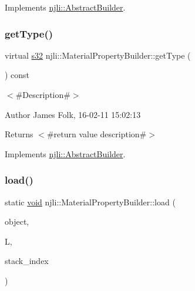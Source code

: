 Implements \mbox{\hyperlink{classnjli_1_1_abstract_builder_a0f2d344fcf697b167f4f2b1122b5fb33}{njli\+::\+Abstract\+Builder}}.

\mbox{\label{classnjli_1_1_material_property_builder_adf85273c4fad09304a9df9f7e8f3be9b}} 
\subsubsection{\texorpdfstring{get\+Type()}{getType()}}
{\footnotesize\ttfamily virtual \mbox{\hyperlink{_util_8h_aa62c75d314a0d1f37f79c4b73b2292e2}{s32}} njli\+::\+Material\+Property\+Builder\+::get\+Type (\begin{DoxyParamCaption}{ }\end{DoxyParamCaption}) const\hspace{0.3cm}{\ttfamily [virtual]}}



$<$\#\+Description\#$>$ 

\begin{DoxyAuthor}{Author}
James Folk, 16-\/02-\/11 15\+:02\+:13
\end{DoxyAuthor}
\begin{DoxyReturn}{Returns}
$<$\#return value description\#$>$ 
\end{DoxyReturn}


Implements \mbox{\hyperlink{classnjli_1_1_abstract_builder_abb4a8161cd71be12807fe85864b67050}{njli\+::\+Abstract\+Builder}}.

\mbox{\label{classnjli_1_1_material_property_builder_ab87af016322723607bcf6c467abd65dc}} 
\subsubsection{\texorpdfstring{load()}{load()}}
{\footnotesize\ttfamily static \mbox{\hyperlink{_thread_8h_af1e856da2e658414cb2456cb6f7ebc66}{void}} njli\+::\+Material\+Property\+Builder\+::load (\begin{DoxyParamCaption}\item[{\mbox{\hyperlink{classnjli_1_1_material_property_builder}{Material\+Property\+Builder}} \&}]{object,  }\item[{lua\+\_\+\+State $\ast$}]{L,  }\item[{int}]{stack\+\_\+index }\end{DoxyParamCaption})\hspace{0.3cm}{\ttfamily [static]}}



